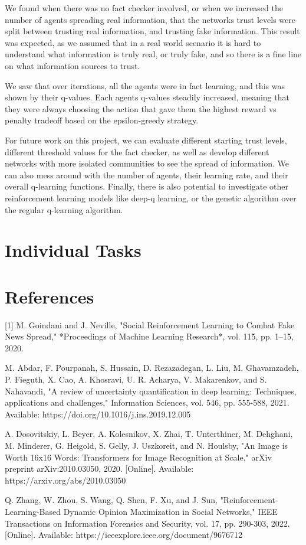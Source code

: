 \documentclass[twoside]{article}
\begin{document}
We found when there was no fact checker involved, or when we increased the number of agents spreading real information, that the networks trust levels were split between trusting real information, and trusting fake information. This result was expected, as we assumed that in a real world scenario it is hard to understand what information is truly real, or truly fake, and so there is a fine line on what information sources to trust.

We saw that over iterations, all the agents were in fact learning, and this was shown by their q-values. Each agents q-values steadily increased, meaning that they were always choosing the action that gave them the highest reward vs penalty tradeoff based on the epsilon-greedy strategy.

For future work on this project, we can evaluate different starting trust levels, different threshold values for the fact checker, as well as develop different networks with more isolated communities to see the spread of information. We can also mess around with the number of agents, their learning rate, and their overall q-learning functions. Finally, there is also potential to investigate other reinforcement learning models like deep-q learning, or the genetic algorithm over the regular q-learning algorithm.

\section{Individual Tasks}


\section{References}
[1] M. Goindani and J. Neville, "Social Reinforcement Learning to Combat Fake News Spread," *Proceedings of Machine Learning Research*, vol. 115, pp. 1–15, 2020.

\sloppy
[2] M. Abdar, F. Pourpanah, S. Hussain, D. Rezazadegan, L. Liu, M. Ghavamzadeh, P. Fieguth, X. Cao, A. Khosravi, U. R. Acharya, V. Makarenkov, and S. Nahavandi, "A review of uncertainty quantification in deep learning: Techniques, applications and challenges," Information Sciences, vol. 546, pp. 555-588, 2021. Available: https://doi.org/10.1016/j.ins.2019.12.005

\sloppy
[3] A. Dosovitskiy, L. Beyer, A. Kolesnikov, X. Zhai, T. Unterthiner, M. Dehghani, M. Minderer, G. Heigold, S. Gelly, J. Uszkoreit, and N. Houlsby, "An Image is Worth 16x16 Words: Transformers for Image Recognition at Scale," arXiv preprint arXiv:2010.03050, 2020. [Online]. Available: https://arxiv.org/abs/2010.03050

\sloppy
[4] Q. Zhang, W. Zhou, S. Wang, Q. Shen, F. Xu, and J. Sun, "Reinforcement-Learning-Based Dynamic Opinion Maximization in Social Networks," IEEE Transactions on Information Forensics and Security, vol. 17, pp. 290-303, 2022. [Online]. Available: https://ieeexplore.ieee.org/document/9676712


%
\end{document}
